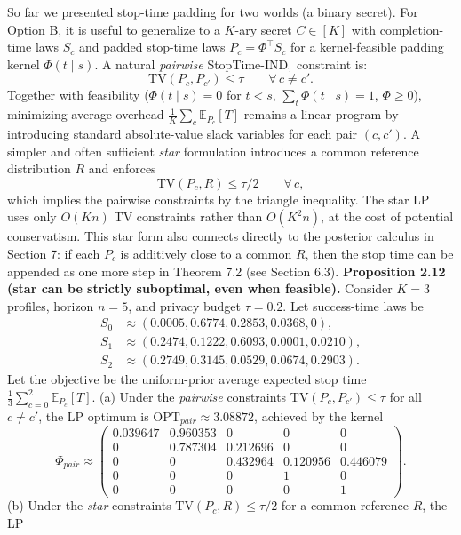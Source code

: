 \documentclass[11pt]{article}
\begin{document}
So far we presented stop-time padding for two worlds (a binary secret).
For Option B, it is useful to generalize to a \(K\)-ary secret
\(C\in[K]\) with completion-time laws \(S_c\) and padded stop-time laws
\(P_c=\Phi^\top S_c\) for a kernel-feasible padding kernel
\(\Phi(t\mid s)\). A natural \emph{pairwise} StopTime-IND\(_\tau\)
constraint is: \[
\mathrm{TV}(P_c,P_{c'}) \le \tau \qquad \forall\,c\neq c'.
\] Together with feasibility (\(\Phi(t\mid s)=0\) for \(t<s\),
\(\sum_t \Phi(t\mid s)=1\), \(\Phi\ge 0\)), minimizing average overhead
\(\frac1K\sum_c \mathbb{E}_{P_c}[T]\) remains a linear program by
introducing standard absolute-value slack variables for each pair
\((c,c')\). A simpler and often sufficient \emph{star} formulation
introduces a common reference distribution \(R\) and enforces \[
\mathrm{TV}(P_c,R) \le \tau/2 \qquad \forall\,c,
\] which implies the pairwise constraints by the triangle inequality.
The star LP uses only \(O(Kn)\) TV constraints rather than \(O(K^2n)\),
at the cost of potential conservatism. This star form also connects
directly to the posterior calculus in Section 7: if each \(P_c\) is
additively close to a common \(R\), then the stop time can be appended
as one more step in Theorem 7.2 (see Section 6.3). \textbf{Proposition
2.12 (star can be strictly suboptimal, even when feasible).} Consider
\(K=3\) profiles, horizon \(n=5\), and privacy budget \(\tau=0.2\). Let
success-time laws be \[
\begin{aligned}
S_0 &\approx (0.0005,0.6774,0.2853,0.0368,0),\\
S_1 &\approx (0.2474,0.1222,0.6093,0.0001,0.0210),\\
S_2 &\approx (0.2749,0.3145,0.0529,0.0674,0.2903).
\end{aligned}
\] Let the objective be the uniform-prior average expected stop time
\(\frac13\sum_{c=0}^2 \mathbb{E}_{P_c}[T]\). (a) Under the
\emph{pairwise} constraints \(\mathrm{TV}(P_c,P_{c'})\le \tau\) for all
\(c\neq c'\), the LP optimum is \(\mathrm{OPT}_{pair}\approx 3.08872\),
achieved by the kernel \[
\Phi_{pair} \approx
\begin{pmatrix}
0.039647 & 0.960353 & 0 & 0 & 0\\
0 & 0.787304 & 0.212696 & 0 & 0\\
0 & 0 & 0.432964 & 0.120956 & 0.446079\\
0 & 0 & 0 & 1 & 0\\
0 & 0 & 0 & 0 & 1
\end{pmatrix}.
\] (b) Under the \emph{star} constraints
\(\mathrm{TV}(P_c,R)\le \tau/2\) for a common reference \(R\), the LP
\end{document}
